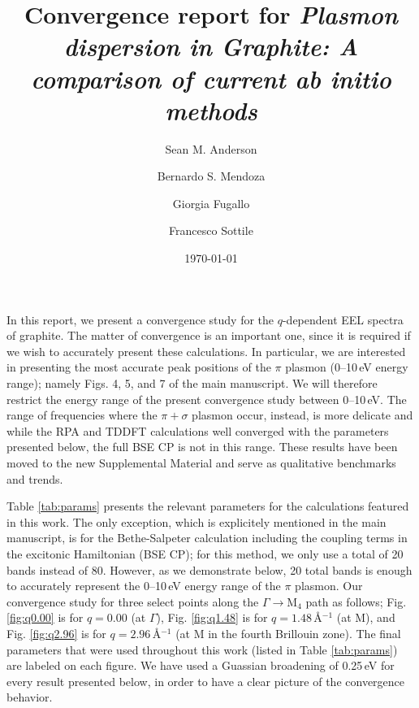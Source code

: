 \documentclass[aps,prb,10pt,superscriptaddress,notitlepage]{revtex4-1}
\begin{document}
\title{Convergence report for \emph{Plasmon dispersion in Graphite: A comparison
of current ab initio methods}}
\author{Sean M. Anderson}%
\author{Bernardo S. Mendoza}%
\author{Giorgia Fugallo}%
\author{Francesco Sottile}%
\date{\today}

\maketitle

In this report, we present a convergence study for the $q$-dependent EEL spectra
of graphite. The matter of convergence is an important one, since it is required
if we wish to accurately present these calculations. In particular, we are
interested in presenting the most accurate peak positions of the $\pi$ plasmon
(0--10\,eV energy range); namely Figs. 4, 5, and 7 of the main manuscript. We
will therefore restrict the energy range of the present convergence study
between 0--10\,eV. The range of frequencies where the $\pi + \sigma$ plasmon
occur, instead, is more delicate and while the RPA and TDDFT calculations well
converged with the parameters presented below, the full BSE CP is not in this
range. These results have been moved to the new Supplemental Material and serve
as qualitative benchmarks and trends.

Table \ref{tab:params} presents the relevant parameters for the calculations
featured in this work. The only exception, which is explicitely mentioned in the
main manuscript, is for the Bethe-Salpeter calculation including the coupling
terms in the excitonic Hamiltonian (BSE CP); for this method, we only use a
total of 20 bands instead of 80. However, as we demonstrate below, 20 total
bands is enough to accurately represent the 0--10\,eV energy range of the $\pi$
plasmon. Our convergence study for three select points along the
$\Gamma\rightarrow\mathrm{M}_{4}$ path as follows; Fig. \ref{fig:q0.00} is for
$q=0.00$ (at $\Gamma$), Fig. \ref{fig:q1.48} is for $q=1.48$\,\r{A}$^{-1}$ (at
M), and Fig. \ref{fig:q2.96} is for $q=2.96$\,\r{A}$^{-1}$ (at M in the fourth
Brillouin zone). The final parameters that were used throughout this work
(listed in Table \ref{tab:params}) are labeled on each figure. We have used a
Guassian broadening of 0.25\,eV for every result presented below, in order to
have a clear picture of the convergence behavior.
\end{document}
